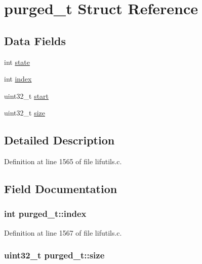 \hypertarget{structpurged__t}{}\section{purged\+\_\+t Struct Reference}
\label{structpurged__t}
\subsection*{Data Fields}
\begin{DoxyCompactItemize}
\item 
int \hyperlink{structpurged__t_a2c08c2063d9649c18d5316a50cf5bec6}{state}
\item 
int \hyperlink{structpurged__t_a55e17d8d1618d28e79b75908367d34a9}{index}
\item 
uint32\+\_\+t \hyperlink{structpurged__t_afeb1148800092fe0b7e73a9dc6839a37}{start}
\item 
uint32\+\_\+t \hyperlink{structpurged__t_ab854d8b2eda17fe05b3dac138e3f70da}{size}
\end{DoxyCompactItemize}


\subsection{Detailed Description}


Definition at line 1565 of file lifutils.\+c.



\subsection{Field Documentation}
\subsubsection[{\texorpdfstring{index}{index}}]{\setlength{\rightskip}{0pt plus 5cm}int purged\+\_\+t\+::index}\hypertarget{structpurged__t_a55e17d8d1618d28e79b75908367d34a9}{}\label{structpurged__t_a55e17d8d1618d28e79b75908367d34a9}


Definition at line 1567 of file lifutils.\+c.

\subsubsection[{\texorpdfstring{size}{size}}]{\setlength{\rightskip}{0pt plus 5cm}uint32\+\_\+t purged\+\_\+t\+::size}\hypertarget{structpurged__t_ab854d8b2eda17fe05b3dac138e3f70da}{}\label{structpurged__t_ab854d8b2eda17fe05b3dac138e3f70da}


